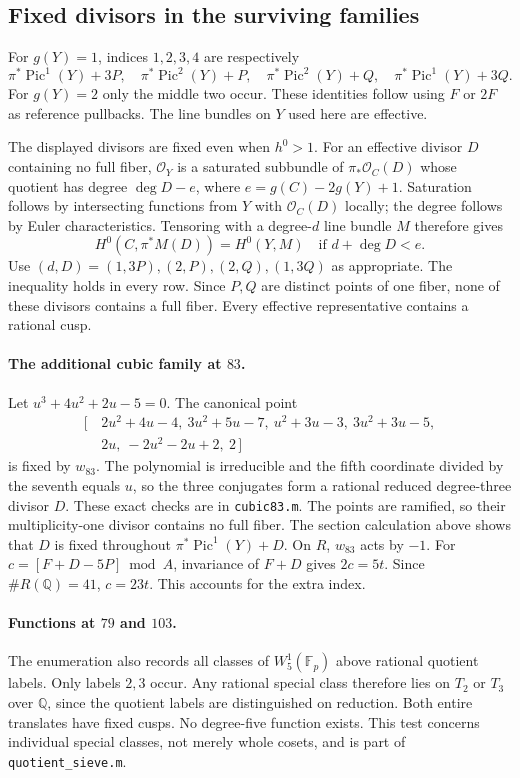 \documentclass[11pt,a4paper]{article}
\newcommand{\Q}{\mathbb Q}
\newcommand{\F}{\mathbb F}
\newcommand{\Pic}{\operatorname{Pic}}
\begin{document}
\subsection{Fixed divisors in the surviving families}
For $g(Y)=1$, indices $1,2,3,4$ are respectively
\[
 \pi^*\Pic^1(Y)+3P,\quad \pi^*\Pic^2(Y)+P,\quad
 \pi^*\Pic^2(Y)+Q,\quad \pi^*\Pic^1(Y)+3Q.
\]
For $g(Y)=2$ only the middle two occur.
These identities follow using $F$ or $2F$ as reference pullbacks.
The line bundles on $Y$ used here are effective.

The displayed divisors are fixed even when $h^0>1$.
For an effective divisor $D$ containing no full fiber,
$\mathcal O_Y$ is a saturated subbundle of $\pi_*\mathcal O_C(D)$
whose quotient has degree $\deg D-e$, where $e=g(C)-2g(Y)+1$.
Saturation follows by intersecting functions from $Y$ with
$\mathcal O_C(D)$ locally; the degree follows by Euler characteristics.
Tensoring with a degree-$d$ line bundle $M$ therefore gives
\[
 H^0(C,\pi^*M(D))=H^0(Y,M)\quad\text{if }d+\deg D<e.
\]
Use $(d,D)=(1,3P),(2,P),(2,Q),(1,3Q)$ as appropriate.
The inequality holds in every row. Since $P,Q$ are distinct points of
one fiber, none of these divisors contains a full fiber.
Every effective representative contains a rational cusp.

\paragraph{The additional cubic family at $83$.}
Let $u^3+4u^2+2u-5=0$. The canonical point
\[
\begin{split}
[\, &2u^2+4u-4,\ 3u^2+5u-7,\ u^2+3u-3,\ 3u^2+3u-5,\\
    &2u,\ -2u^2-2u+2,\ 2\,]
\end{split}
\]
is fixed by $w_{83}$. The polynomial is irreducible and the fifth
coordinate divided by the seventh equals $u$, so the three conjugates
form a rational reduced degree-three divisor $D$.
These exact checks are in \texttt{cubic83.m}.
The points are ramified, so their multiplicity-one divisor contains no
full fiber. The section calculation above shows that $D$ is fixed
throughout $\pi^*\Pic^1(Y)+D$.
On $R$, $w_{83}$ acts by $-1$. For $c=[F+D-5P]\bmod A$,
invariance of $F+D$ gives $2c=5t$.
Since $\#R(\Q)=41$, $c=23t$. This accounts for the extra index.

\paragraph{Functions at $79$ and $103$.}
The enumeration also records all classes of $W^1_5(\F_p)$ above rational
quotient labels. Only labels $2,3$ occur. Any rational special class
therefore lies on $T_2$ or $T_3$ over $\Q$, since the quotient labels
are distinguished on reduction. Both entire translates have fixed cusps.
No degree-five function exists. This test concerns individual special
classes, not merely whole cosets, and is part of
\texttt{quotient\_sieve.m}.
\end{document}
